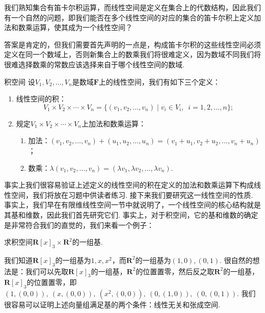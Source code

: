 我们熟知集合有笛卡尔积运算，而线性空间是定义在集合上的代数结构，因此我们有一个自然的问题，即我们能否在多个线性空间的对应的集合的笛卡尔积上定义加法和数乘运算，使其成为一个线性空间？

答案是肯定的，但我们需要首先声明的一点是，构成笛卡尔积的这些线性空间必须定义在同一个数域上，否则新集合上的数乘我们将很难定义，因为数域不同我们将很难选择数乘的常数应该选择来自于哪个线性空间的数域.
\begin{definition}{}{积空间}
    设$V_1,V_2,\ldots,V_n$是数域$\mathbf{F}$上的线性空间，我们有如下三个定义：
    \begin{enumerate}
        \item 线性空间的积：
              \[V_1 \times V_2 \times \cdots \times V_n=\{(v_1,v_2,\ldots,v_n)\mid v_i \in V_i,\enspace i=1,2,\ldots,n\};\]

        \item 规定$V_1 \times V_2 \times \cdots \times V_n$上加法和数乘运算：
              \begin{enumerate}
                  \item 加法：$(v_1,v_2,\ldots,v_n)+(u_1,u_2,\ldots,u_n)=(v_1+u_1,v_2+u_2,\ldots,v_n+u_n)$；

                  \item 数乘：$\lambda(v_1,v_2,\ldots,v_n)=(\lambda v_1,\lambda v_2,\ldots,\lambda v_n)$.
              \end{enumerate}
    \end{enumerate}
\end{definition}

事实上我们很容易验证上述定义的线性空间的积在定义的加法和数乘运算下构成线性空间，我们将放在习题中供读者练习. 接下来我们要研究这一线性空间的性质. 事实上，我们早在有限维线性空间一节中就说明了，一个线性空间的核心结构就是其基和维数，因此我们首先研究它们. 事实上，对于积空间，它的基和维数的确定是非常符合我们的直觉的，我们来看一个例子：
\begin{example}{}{}
    求积空间$\mathbf{R}[x]_3\times\mathbf{R}^2$的一组基.
\end{example}

\begin{solution}
    我们知道$\mathbf{R}[x]_3$的一组基为$1,x,x^2$，而$\mathbf{R}^2$的一组基为$(1,0),(0,1)$. 很自然的想法是：我们可以先取$\mathbf{R}[x]_3$的一组基，$\mathbf{R}^2$的位置置零，然后反之取$\mathbf{R}^2$的一组基，$\mathbf{R}[x]_3$的位置置零，即$(1,(0,0)),\ (x,(0,0)),\ (x^2,(0,0)),\ (0,(1,0)),\ (0,(0,1))$. 我们很容易可以证明上述向量组满足基的两个条件：线性无关和张成空间.
\end{solution}

